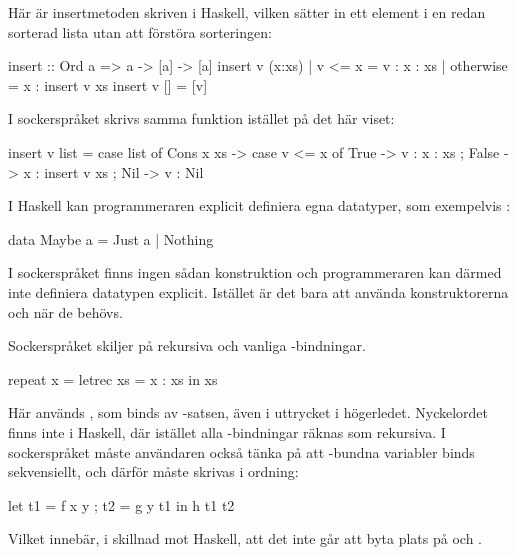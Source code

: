 \documentclass[Rapport]{subfiles}
\begin{document}
Här är insertmetoden skriven i Haskell, vilken sätter in ett element i en redan sorterad
lista utan att förstöra sorteringen:

\begin{codeEx}
  insert :: Ord a => a -> [a] -> [a]
  insert v (x:xs) 
      | v <= x    = v : x : xs
      | otherwise = x : insert v xs 
  insert v [] = [v]
\end{codeEx}                  

I sockerspråket skrivs samma funktion istället på det här viset:

\begin{codeEx}
  insert v list = case list of
      { Cons x xs -> case v <= x of
          { True  -> v : x : xs
          ; False -> x : insert v xs
          }
      ; Nil -> v : Nil
      }
\end{codeEx}

I Haskell kan programmeraren explicit definiera egna datatyper, som exempelvis :
    
\begin{codeEx}
data Maybe a = Just a | Nothing
\end{codeEx}

I sockerspråket finns ingen sådan konstruktion och programmeraren kan därmed inte
definiera datatypen explicit. Istället är det bara att använda
konstruktorerna  och  när de behövs.


Sockerspråket skiljer på rekursiva och vanliga -bindningar. 

\begin{codeEx}
repeat x = letrec xs = x : xs in xs  
\end{codeEx}

Här används , som binds av -satsen, även i uttrycket i högerledet.
Nyckelordet  finns inte i Haskell, där istället alla -bindningar räknas som rekursiva. I
sockerspråket måste användaren också tänka på att -bundna variabler binds
sekvensiellt, och därför måste skrivas i ordning:

\begin{codeEx}
let { t1 = f x y
    ; t2 = g y t1
    }
in  h t1 t2
\end{codeEx}

Vilket innebär, i skillnad mot Haskell, att det inte går att byta plats på  och .
\end{document}
